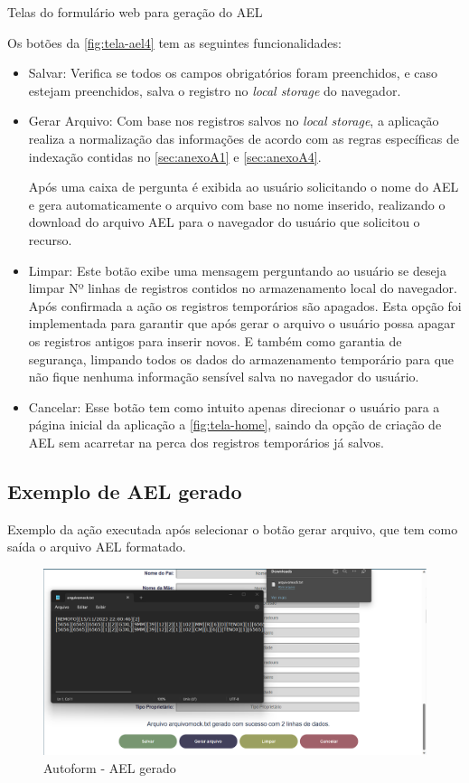 Telas do formulário web para geração do AEL

Os botões da \autoref{fig:tela-ael4} tem as seguintes funcionalidades:
\begin{itemize}
    \item Salvar: Verifica se todos os campos obrigatórios foram preenchidos, e caso estejam preenchidos, salva o registro no \textit{local storage} do navegador.
    \item Gerar Arquivo: Com base nos registros salvos no \textit{local storage}, a aplicação realiza a normalização das informações de acordo com as regras específicas de indexação contidas no \autoref{sec:anexoA1} e \autoref{sec:anexoA4}.
     
    Após uma caixa de pergunta é exibida ao usuário solicitando o nome do AEL e gera automaticamente o arquivo com base no nome inserido, realizando o download do arquivo AEL para o navegador do usuário que solicitou o recurso. 
    \item Limpar: Este botão exibe uma mensagem perguntando ao usuário se deseja limpar Nº linhas de registros contidos no armazenamento local do navegador.  Após confirmada a ação os registros temporários são apagados. 
    Esta opção foi implementada para garantir que após gerar o arquivo o usuário possa apagar os registros antigos para inserir novos. E também como garantia de segurança, limpando todos os dados do armazenamento temporário para  que não fique nenhuma informação sensível salva no navegador do usuário.
    \item Cancelar: Esse botão tem como intuito apenas direcionar o usuário para a página inicial da aplicação a \autoref{fig:tela-home}, saindo da opção de criação de AEL sem acarretar na perca dos registros temporários já salvos.
\end{itemize}

\subsection{Exemplo de AEL gerado}
Exemplo da ação executada após selecionar o botão gerar arquivo, que tem como saída o arquivo AEL formatado.

\begin{figure}[H]
    \caption{\label{fig:tela-ael-gerado}Autoform - AEL gerado}
    \begin{center}
        \includegraphics[scale=0.5]{imagens/autoform-ael-gerado.png}
    \end{center}
\end{figure}


